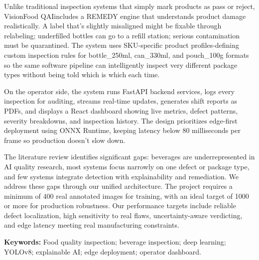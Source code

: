 \documentclass[12pt,a4paper]{report}
\newcommand{\shorttitle}{VisionFood QAI}
\begin{document}
Unlike traditional inspection systems that simply mark products as pass or reject, \shorttitle includes a REMEDY engine that understands product damage realistically. A label that's slightly misaligned might be fixable through relabeling; underfilled bottles can go to a refill station; serious contamination must be quarantined. The system uses SKU-specific product profiles-defining custom inspection rules for bottle\_250ml, can\_330ml, and pouch\_100g formats so the same software pipeline can intelligently inspect very different package types without being told which is which each time.

On the operator side, the system runs FastAPI backend services, logs every inspection for auditing, streams real-time updates, generates shift reports as PDFs, and displays a React dashboard showing live metrics, defect patterns, severity breakdowns, and inspection history. The design prioritizes edge-first deployment using ONNX Runtime, keeping latency below 80 milliseconds per frame so production doesn't slow down.

The literature review identifies significant gaps: beverages are underrepresented in AI quality research, most systems focus narrowly on one defect or package type, and few systems integrate detection with explainability and remediation. We address these gaps through our unified architecture. The project requires a minimum of 400 real annotated images for training, with an ideal target of 1000 or more for production robustness. Our performance targets include reliable defect localization, high sensitivity to real flaws, uncertainty-aware verdicting, and edge latency meeting real manufacturing constraints.

\vspace{1em}
\noindent\textbf{Keywords:} Food quality inspection; beverage inspection; deep learning; YOLOv8; explainable AI; edge deployment; operator dashboard.

\newpage
{}
\tableofcontents

\newpage
{}
\listoftables

\newpage
{}
\listoffigures

\newpage
{}
\end{document}
